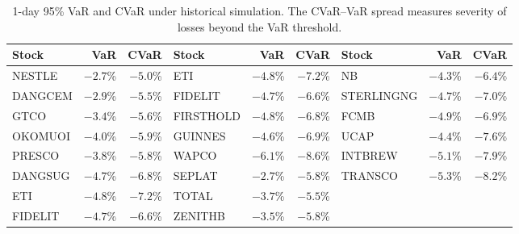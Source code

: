 \documentclass[twoside,11pt]{article}
\newcommand{\ngx}{\textsc{ngx}}
\begin{document}
	\begin{table}[ht]
		\centering
		\caption{1-day 95\% VaR and CVaR under historical simulation.
			The CVaR--VaR spread measures severity of losses beyond the
			VaR threshold.}
		\label{tab:risk}
		\small
		\begin{tabular}{lrr|lrr|lrr}
			\toprule
			\textbf{Stock} & \textbf{VaR} & \textbf{CVaR} &
			\textbf{Stock} & \textbf{VaR} & \textbf{CVaR} &
			\textbf{Stock} & \textbf{VaR} & \textbf{CVaR} \\
			\midrule
			NESTLE    & $-2.7$\% & $-5.0$\% & ETI        & $-4.8$\% & $-7.2$\% & NB         & $-4.3$\% & $-6.4$\% \\
			DANGCEM   & $-2.9$\% & $-5.5$\% & FIDELIT    & $-4.7$\% & $-6.6$\% & STERLINGNG & $-4.7$\% & $-7.0$\% \\
			GTCO      & $-3.4$\% & $-5.6$\% & FIRSTHOLD  & $-4.8$\% & $-6.8$\% & FCMB       & $-4.9$\% & $-6.9$\% \\
			OKOMUOI   & $-4.0$\% & $-5.9$\% & GUINNES    & $-4.6$\% & $-6.9$\% & UCAP       & $-4.4$\% & $-7.6$\% \\
			PRESCO    & $-3.8$\% & $-5.8$\% & WAPCO      & $-6.1$\% & $-8.6$\% & INTBREW    & $-5.1$\% & $-7.9$\% \\
			DANGSUG   & $-4.7$\% & $-6.8$\% & SEPLAT     & $-2.7$\% & $-5.8$\% & TRANSCO    & $-5.3$\% & $-8.2$\% \\
			ETI       & $-4.8$\% & $-7.2$\% & TOTAL      & $-3.7$\% & $-5.5$\% &            &          &           \\
			FIDELIT   & $-4.7$\% & $-6.6$\% & ZENITHB    & $-3.5$\% & $-5.8$\% &            &          &           \\
			\bottomrule
		\end{tabular}
	\end{table}
%	
\end{document}
